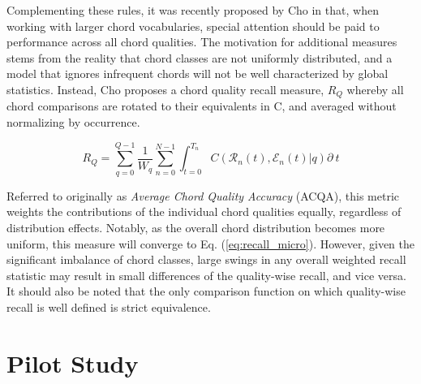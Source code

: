 Complementing these rules, it was recently proposed by Cho in \cite{Cho2014PhD} that, when working with larger chord vocabularies, special attention should be paid to performance across all chord qualities.
The motivation for additional measures stems from the reality that chord classes are not uniformly distributed, and a model that ignores infrequent chords will not be well characterized by global statistics.
Instead, Cho proposes a chord quality recall measure, $R_{Q}$ whereby all chord comparisons are rotated to their equivalents in C, and averaged without normalizing by occurrence.

\begin{equation}
R_{Q} = \sum_{q=0}^{Q-1}\frac{1}{W_q}\sum_{n=0}^{N-1}\int_{t=0}^{T_n}C(\mathcal{R}_n(t), \mathcal{E}_n(t) | q)\partial~t
\end{equation}

\noindent Referred to originally as \emph{Average Chord Quality Accuracy} (ACQA), this metric weights the contributions of the individual chord qualities equally, regardless of distribution effects.
Notably, as the overall chord distribution becomes more uniform, this measure will converge to Eq. (\ref{eq:recall_micro}).
However, given the significant imbalance of chord classes, large swings in any overall weighted recall statistic may result in small differences of the quality-wise recall, and vice versa.
It should also be noted that the only comparison function on which quality-wise recall is well defined is strict equivalence.


\section{Pilot Study}
\label{sec:pilot_study}

